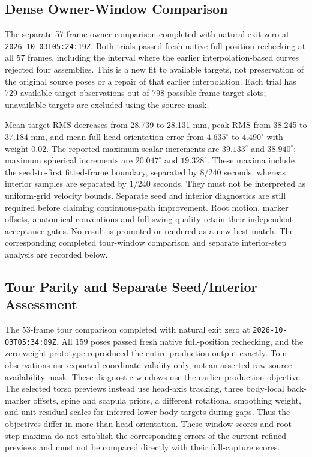 \documentclass[11pt,a4paper]{article}
\begin{document}
\subsection{Dense Owner-Window Comparison}
The separate 57-frame owner comparison completed with natural exit zero at
\texttt{2026-10-03T05:24:19Z}. Both trials passed fresh native full-position
rechecking at all 57 frames, including the interval where the earlier
interpolation-based curves rejected four assemblies. This is a new fit to
available targets, not preservation of the original source poses or a
repair of that earlier interpolation. Each trial has 729 available target
observations out of 798 possible frame-target slots; unavailable targets
are excluded using the source mask.

Mean target RMS decreases from 28.739 to 28.131 mm, peak RMS from 38.245 to
37.184 mm, and mean full-head orientation error from $4.635^{\circ}$ to
$4.490^{\circ}$ with weight 0.02. The reported maximum scalar increments
are $39.133^{\circ}$ and $38.940^{\circ}$; maximum spherical increments are
$20.047^{\circ}$ and $19.328^{\circ}$. These maxima include the seed-to-first
fitted-frame boundary, separated by $8/240$ seconds, whereas interior
samples are separated by $1/240$ seconds. They must not be interpreted as
uniform-grid velocity bounds. Separate seed and interior diagnostics are
still required before claiming continuous-path improvement. Root motion,
marker offsets, anatomical conventions and full-swing quality retain their
independent acceptance gates. No result is promoted or rendered as a new
best match. The corresponding completed tour-window comparison and separate interior-step analysis are recorded below.
\subsection{Tour Parity and Separate Seed/Interior Assessment}
The 53-frame tour comparison completed with natural exit zero at
\texttt{2026-10-03T05:34:09Z}. All 159 poses passed fresh native full-position
rechecking, and the zero-weight prototype reproduced the entire production
output exactly. Tour observations use exported-coordinate validity only,
not an asserted raw-source availability mask. These diagnostic windows use
the earlier production objective. The selected torso previews instead use
head-axis tracking, three body-local back-marker offsets, spine and scapula
priors, a different rotational smoothing weight, and unit residual scales
for inferred lower-body targets during gaps. Thus the objectives differ in
more than head orientation. These window scores and root-step maxima do not
establish the corresponding errors of the current refined previews and must
not be compared directly with their full-capture scores.
\end{document}
